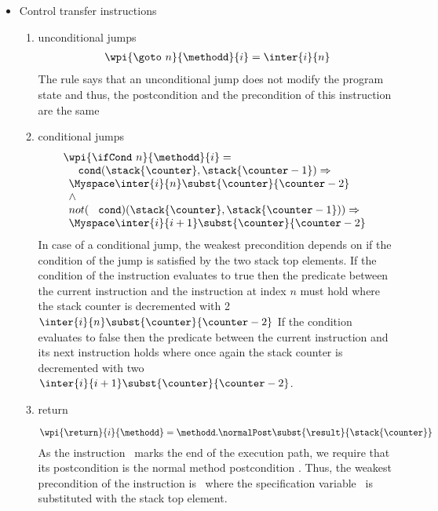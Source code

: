 \begin{itemize}	
\item Control transfer instructions
\begin{enumerate}
 \item unconditional jumps \\
  $$\begin{array}{l} \wpi{\goto \  n }{\methodd}{i} =   \inter{i}{n}  \end{array} $$
  The rule says that an unconditional jump does not modify the program state and thus, the postcondition and the precondition of this instruction
  are the same

\item conditional jumps
  $$ \begin{array}{l}
          \wpi{ \ifCond  \  n }{\methodd}{i} =\\
	   \begin{array}{l} 
                  \mbox{ \rm \texttt{ cond}} ( \stack{\counter}, \stack{\counter - 1} ) \Rightarrow \\
                  \Myspace \inter{i}{n}\subst{\counter}{ \counter - 2 } \\
			 \wedge  \\
		  not(\mbox{ \rm \texttt{ cond}})( \stack{\counter},\stack{\counter - 1} ))  \Rightarrow \\
		  \Myspace \inter{i}{i+1}\subst{\counter}{\counter - 2} 
           \end{array}
  \end{array}$$
   In case of a conditional jump, the weakest precondition depends on if  the condition of the jump is satisfied
   by the two stack top elements. %
   If the condition of the instruction evaluates to true then the predicate between the current instruction and
   the instruction at index $n$ must hold  where the stack counter is decremented with 2 $\inter{i}{n}\subst{\counter}{ \counter - 2} $ 
   If the condition evaluates to false then the predicate between the current instruction and its next instruction holds where once again the stack counter
   is decremented with two $ \inter{i}{i+1}\subst{\counter}{\counter - 2} $. 

 \item return 
 
 $$\wpi{\return}{i}{\methodd}  = \methodd.\normalPost \subst{ \result }{\stack{\counter}}$$
 As the instruction \return \ marks the end of the execution path, we require that its postcondition is the normal method postcondition \normalPost.
 Thus, the weakest precondition of the instruction is \normalPost \ where the specification variable \result \  is substituted with the stack top
 element.


\end{enumerate}
\end{itemize}
